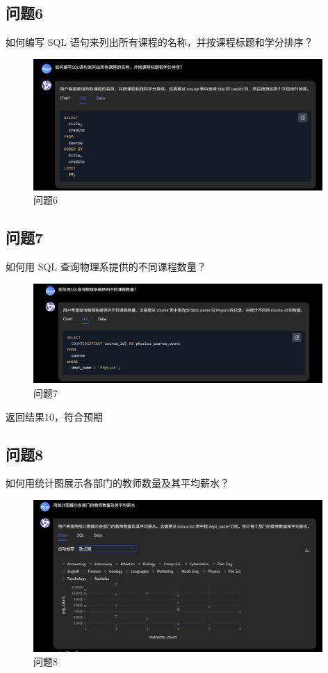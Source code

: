 \documentclass{article}
\begin{document}
	\subsection{问题6}
	如何编写 SQL 语句来列出所有课程的名称，并按课程标题和学分排序？
	
	\begin{figure}[H]
		\centering
		\includegraphics[width=11cm]{./images/28.问题6.png}
		\caption{问题6}
	\end{figure}
	
	\subsection{问题7}
	如何用 SQL 查询物理系提供的不同课程数量？
	
	\begin{figure}[H]
		\centering
		\includegraphics[width=11cm]{./images/29.问题7.png}
		\caption{问题7}
	\end{figure}
	
	返回结果10，符合预期
	
	\subsection{问题8}
	如何用统计图展示各部门的教师数量及其平均薪水？
	
	\begin{figure}[H]
		\centering
		\includegraphics[width=11cm]{./images/30.问题8.png}
		\caption{问题8}
	\end{figure}
	
\end{document}
